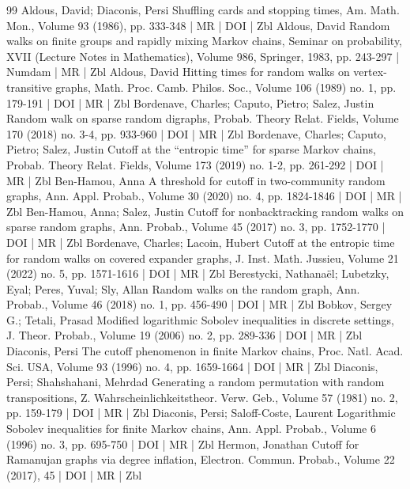 \begin{thebibliography}{99}
 Aldous, David; Diaconis, Persi Shuffling cards and stopping times, Am. Math. Mon., Volume 93 (1986), pp. 333-348 | MR | DOI | Zbl
 Aldous, David Random walks on finite groups and rapidly mixing Markov chains, Seminar on probability, XVII (Lecture Notes in Mathematics), Volume 986, Springer, 1983, pp. 243-297 | Numdam | MR | Zbl
 Aldous, David Hitting times for random walks on vertex-transitive graphs, Math. Proc. Camb. Philos. Soc., Volume 106 (1989) no. 1, pp. 179-191 | DOI | MR | Zbl
 Bordenave, Charles; Caputo, Pietro; Salez, Justin Random walk on sparse random digraphs, Probab. Theory Relat. Fields, Volume 170 (2018) no. 3-4, pp. 933-960 | DOI | MR | Zbl
 Bordenave, Charles; Caputo, Pietro; Salez, Justin Cutoff at the “entropic time” for sparse Markov chains, Probab. Theory Relat. Fields, Volume 173 (2019) no. 1-2, pp. 261-292 | DOI | MR | Zbl
 Ben-Hamou, Anna A threshold for cutoff in two-community random graphs, Ann. Appl. Probab., Volume 30 (2020) no. 4, pp. 1824-1846 | DOI | MR | Zbl
 Ben-Hamou, Anna; Salez, Justin Cutoff for nonbacktracking random walks on sparse random graphs, Ann. Probab., Volume 45 (2017) no. 3, pp. 1752-1770 | DOI | MR | Zbl
 Bordenave, Charles; Lacoin, Hubert Cutoff at the entropic time for random walks on covered expander graphs, J. Inst. Math. Jussieu, Volume 21 (2022) no. 5, pp. 1571-1616 | DOI | MR | Zbl
 Berestycki, Nathanaël; Lubetzky, Eyal; Peres, Yuval; Sly, Allan Random walks on the random graph, Ann. Probab., Volume 46 (2018) no. 1, pp. 456-490 | DOI | MR | Zbl
 Bobkov, Sergey G.; Tetali, Prasad Modified logarithmic Sobolev inequalities in discrete settings, J. Theor. Probab., Volume 19 (2006) no. 2, pp. 289-336 | DOI | MR | Zbl
 Diaconis, Persi The cutoff phenomenon in finite Markov chains, Proc. Natl. Acad. Sci. USA, Volume 93 (1996) no. 4, pp. 1659-1664 | DOI | MR | Zbl
 Diaconis, Persi; Shahshahani, Mehrdad Generating a random permutation with random transpositions, Z. Wahrscheinlichkeitstheor. Verw. Geb., Volume 57 (1981) no. 2, pp. 159-179 | DOI | MR | Zbl
 Diaconis, Persi; Saloff-Coste, Laurent Logarithmic Sobolev inequalities for finite Markov chains, Ann. Appl. Probab., Volume 6 (1996) no. 3, pp. 695-750 | DOI | MR | Zbl
 Hermon, Jonathan Cutoff for Ramanujan graphs via degree inflation, Electron. Commun. Probab., Volume 22 (2017), 45 | DOI | MR | Zbl

\end{thebibliography}
